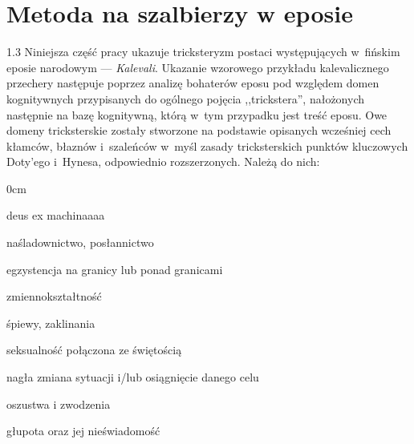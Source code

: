 \documentclass[11pt,a4paper,twoside]{report}
\begin{document}
\chapter{Metoda na szalbierzy w eposie}%
\begin{spacing}{1.3}
Niniejsza część pracy ukazuje tricksteryzm postaci występujących w~fińskim eposie narodowym --- \emph{Kalevali}. Ukazanie wzorowego przykładu kalevalicznego przechery następuje poprzez analizę bohaterów eposu pod względem domen kognitywnych przypisanych do ogólnego pojęcia ,,trickstera'', nałożonych następnie na bazę kognitywną, którą w~tym przypadku jest treść eposu. Owe domeny tricksterskie zostały stworzone na podstawie opisanych wcześniej cech kłamców, błaznów i~szaleńców w~myśl zasady tricksterskich punktów kluczowych Doty’ego i~Hynesa, odpowiednio rozszerzonych. Należą do nich:\\


\begin{adjustwidth}{\parindent}{0cm}
\begin{labeling}{deus ex machinaaaa}

\item [\textbf{więź z bóstwem}] naśladownictwo, posłannictwo
\item [\textbf{ambiwalencja}] egzystencja na granicy lub ponad granicami
\item [\textbf{shapeshifting}] zmiennokształtność
\item [\textbf{magia rytualna}] śpiewy, zaklinania
\item [\textbf{sacrofanum}] seksualność połączona ze świętością
\item [\textbf{deus ex machina}] nagła zmiana sytuacji i/lub osiągnięcie danego celu
\item [\textbf{kłamstwo}] oszustwa i zwodzenia
\item [\textbf{idiotyzm}] głupota oraz jej nieświadomość\\

\end{labeling}
\end{adjustwidth}




\end{spacing}
\end{document}
